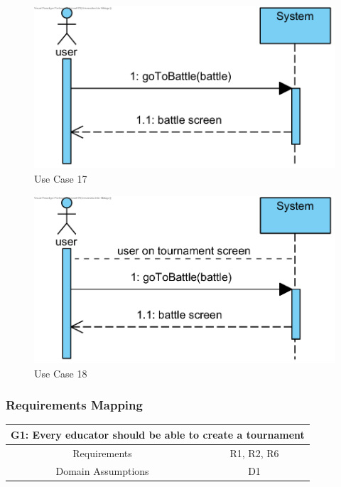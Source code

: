 \documentclass{article}
\begin{document}
\begin{figure}[H]
    \centering
    \includegraphics[width=1\textwidth]{images/UseCaseSequenceDiagrams/UC17}
    \caption{Use Case 17}
    \label{fig:UC17}
\end{figure}

\begin{figure}[H]
    \centering
    \includegraphics[width=1\textwidth]{images/UseCaseSequenceDiagrams/UC18}
    \caption{Use Case 18}
    \label{fig:UC18}
\end{figure}

\newpage

\subsubsection{Requirements Mapping}

\begin{table}[H]
    \centering
    \begin{tabular*}{\linewidth}{@{\extracolsep{\fill}} cc }
        \hline
        \multicolumn{2}{|c|}{\parbox{0.9\dimexpr\textwidth-2\tabcolsep\relax}{\centering\textbf{G1: Every educator should be able to create a tournament}}} \\
        \hline
        Requirements & R1, R2, R6\\ 
        \hline
        Domain Assumptions & D1\\
        \hline
    \end{tabular*}
\end{table}
\end{document}
